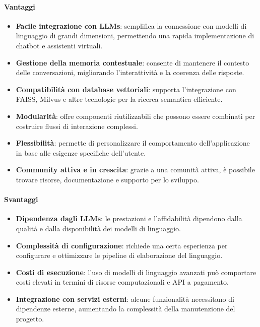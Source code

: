 \documentclass{article}
\begin{document}
\paragraph*{Vantaggi}
\begin{itemize}
    \item \textbf{Facile integrazione con LLMs}: semplifica la connessione con modelli di linguaggio di grandi dimensioni, 
    permettendo una rapida implementazione di chatbot e assistenti virtuali.
    \item \textbf{Gestione della memoria contestuale}: consente di mantenere il contesto delle conversazioni, migliorando 
    l'interattività e la coerenza delle risposte.
    \item \textbf{Compatibilità con database vettoriali}: supporta l'integrazione con FAISS, Milvus e altre tecnologie per la ricerca semantica efficiente.
    \item \textbf{Modularità}: offre componenti riutilizzabili che possono essere combinati per costruire flussi di interazione complessi.
    \item \textbf{Flessibilità}: permette di personalizzare il comportamento dell'applicazione in base alle esigenze specifiche dell'utente.
    \item \textbf{Community attiva e in crescita}: grazie a una comunità attiva, è possibile trovare risorse, documentazione e supporto per lo sviluppo.
\end{itemize}

\paragraph*{Svantaggi}
\begin{itemize}
    \item \textbf{Dipendenza dagli LLMs}: le prestazioni e l'affidabilità dipendono dalla qualità e dalla disponibilità dei modelli di linguaggio.
    \item \textbf{Complessità di configurazione}: richiede una certa esperienza per configurare e ottimizzare le pipeline di elaborazione del linguaggio.
    \item \textbf{Costi di esecuzione}: l'uso di modelli di linguaggio avanzati può comportare costi elevati in termini di risorse 
    computazionali e API a pagamento.
    \item \textbf{Integrazione con servizi esterni}: alcune funzionalità necessitano di dipendenze esterne, aumentando la complessità 
    della manutenzione del progetto.
\end{itemize}
\end{document}

